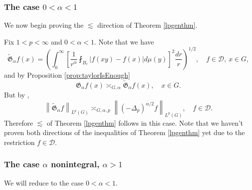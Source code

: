 \documentclass[11pt,reqno]{amsart}
\newcommand{\1}{\mathbf 1}
\begin{document}
\subsubsection{The case $0<\alpha<1$}\label{subsubsec:alpha<1}
We now begin proving the $\lesssim$ direction of Theorem \ref{lpgenthm}.

Fix $1<p<\infty$ and $0<\alpha<1$. Note that we have
\[
\tilde{\mathfrak{G}}_\alpha f\left(x\right)= \left(\int_0^\infty \left[\frac{1}{r^\alpha}\fint_{B_r}\left|f\left(xy\right)-f\left(x\right)\right|d\mu\left(y\right)\right]^2 \frac{dr}{r}\right)^{1/2},\quad f\in \mathcal{D},~x\in G,
\]
and by Proposition \ref{prop:taylorIsEnough}
\[
\mathfrak{G}_\alpha f\left(x\right)\asymp_{G,\alpha}\tilde{\mathfrak{G}}_{\alpha} f\left(x\right),\quad  x\in G.
\]
But by \cite[Theorem 5]{coulhon2001sobolev},
\[
\left\|\tilde{\mathfrak{G}}_\alpha f\right\|_{L^p\left(G\right)}\asymp_{G,\alpha,p} \left\|\left(-\Delta_p\right)^{\alpha/2}f\right\|_{L^p\left(G\right)}, \quad f\in \mathcal{D}.
\]
Therefore $\lesssim$ of Theorem \ref{lpgenthm} follows in this case. Note that we haven't proven both directions of the inequalities of Theorem \ref{lpgenthm} yet due to the restriction $f\in \mathcal{D}$.

\subsubsection{The case $\alpha$ nonintegral, $\alpha>1$}\label{subsubsec:nonintegral>1}

We will reduce to the case $0<\alpha<1$.
\end{document}
